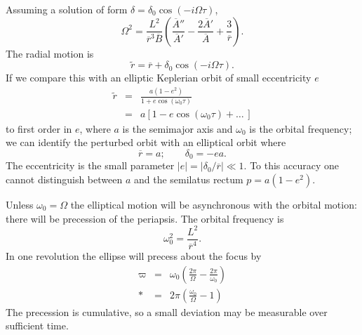 \documentclass[aps,prd,amsfonts,amssymb,amsmath,nofootinbib,reprint,showpacs]{revtex4-1}
\begin{document}
Assuming a solution of form $\delta = \delta_0\cos(-i\Omega\tau)$,
\begin{equation}
\Omega^2 = \frac{L^2}{\overline{r}^3\overline{B}}\left(\frac{\overline{A}''}{\overline{A}'} - \frac{2\overline{A}'}{\overline{A}} + \frac{3}{\overline{r}}\right).
\end{equation}
The radial motion is
\begin{equation}
\widetilde{r} = \overline{r} + \delta_0\cos(-i\Omega\tau).
\end{equation}
If we compare this with an elliptic Keplerian orbit of small eccentricity $e$
\begin{eqnarray}
\widetilde{r} & = & \frac{a(1 - e^2)}{1 + e\cos(\omega_0\tau)} \\
 & = & a\left[1 - e\cos(\omega_0\tau) + \ldots \, \right]
\end{eqnarray}
to first order in $e$, where $a$ is the semimajor axis and $\omega_0$ is the orbital frequency; we can identify the perturbed orbit with an elliptical orbit where~\cite{Kerner2001a}
\begin{equation}
\overline{r} = a; \qquad \delta_0 = -ea.
\end{equation}
The eccentricity is the small parameter $|e| = |\delta_0/\overline{r}| \ll 1$. To this accuracy one cannot distinguish between $a$ and the semilatus rectum $p = a(1 - e^2)$.

Unless $\omega_0 = \Omega$ the elliptical motion will be asynchronous with the orbital motion: there will be precession of the periapsis. The orbital frequency is
\begin{equation}
\omega_0^2 = \frac{L^2}{\overline{r}^4}.
\end{equation}
In one revolution the ellipse will precess about the focus by
\begin{eqnarray}
\varpi & = & \omega_0\left(\frac{2\pi}{\Omega} - \frac{2\pi}{\omega_0}\right) \nonumber \\*
 & = & 2\pi\left(\frac{\omega_0}{\Omega} - 1\right)
\end{eqnarray}
The precession is cumulative, so a small deviation may be measurable over sufficient time.
\end{document}
